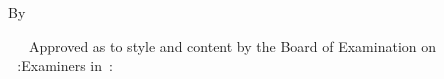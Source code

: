 
\chapter*{\normalfont\MakeUppercase\thetitle}

\parbox{\textwidth}{\centering

\vspace{6pt}{\noindent\newline\theThesisType~Engineering~Thesis}

\vspace{6pt}By

\vspace{6pt}{\ifdefined\theStudyType\MakeUppercase\theauthor\else\MakeUppercase\authorswithroll\fi}
}

\noindent
{~~~Approved as to style and content by the %
\ifdefined\theStudyType Board of Examination on \theDefenseDay~\theDefenseDate\,:\else Examiners in \theDefenseDate\,:\fi
}


\vspace{\ifdefined\theStudyType 4ex \else 8ex\fi}


